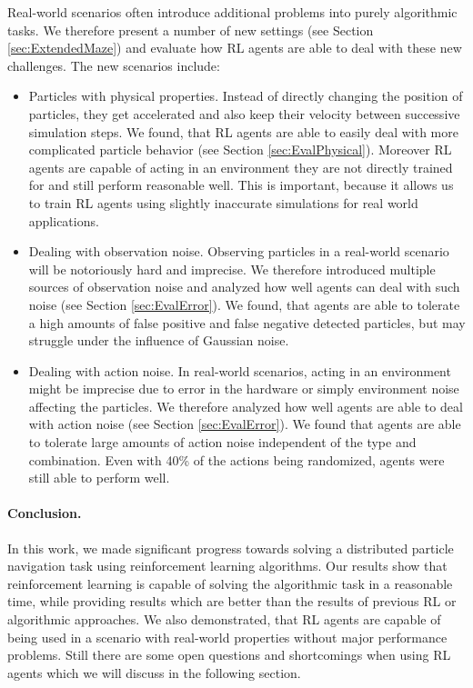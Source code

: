 Real-world scenarios often introduce additional problems into purely algorithmic tasks. We therefore present a number of new settings (see Section \ref{sec:ExtendedMaze}) and evaluate how RL agents are able to deal with these new challenges. The new scenarios include: 
\begin{itemize}
    \item Particles with physical properties. Instead of directly changing the position of particles, they get accelerated and also keep their velocity between successive simulation steps. We found, that RL agents are able to easily deal with more complicated particle behavior (see Section \ref{sec:EvalPhysical}). Moreover RL agents are capable of acting in an environment they are not directly trained for and still perform reasonable well. This is important, because it allows us to train RL agents using slightly inaccurate simulations for real world applications.
    \item Dealing with observation noise. Observing particles in a real-world scenario will be notoriously hard and imprecise. We therefore introduced multiple sources of observation noise and analyzed how well agents can deal with such noise (see Section \ref{sec:EvalError}). We found, that agents are able to tolerate a high amounts of false positive and false negative detected particles, but may struggle under the influence of Gaussian noise.
    \item Dealing with action noise. In real-world scenarios, acting in an environment might be imprecise due to error in the hardware or simply environment noise affecting the particles. We therefore analyzed how well agents are able to deal with action noise (see Section \ref{sec:EvalError}). We found that agents are able to tolerate large amounts of action noise independent of the type and combination. Even with 40\% of the actions being randomized, agents were still able to perform well.
\end{itemize}

\paragraph{Conclusion.} In this work, we made significant progress towards solving a distributed particle navigation task using reinforcement learning algorithms. Our results show that reinforcement learning is capable of solving the algorithmic task in a reasonable time, while providing results which are better than the results of previous RL or algorithmic approaches. We also demonstrated, that RL agents are capable of being used in a scenario with real-world properties without major performance problems. Still there are some open questions and shortcomings when using RL agents which we will discuss in the following section.  

